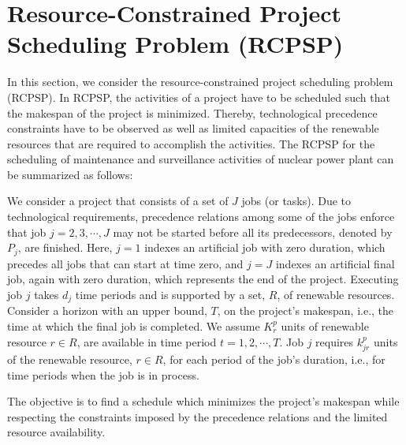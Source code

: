 \section{Resource-Constrained Project Scheduling Problem (RCPSP)}
\label{sec:RCPSP}

In this section, we consider the resource-constrained project scheduling problem (RCPSP).
In RCPSP, the activities of a project have to be scheduled such that the makespan of the
project is minimized. Thereby, technological precedence constraints have to be observed
as well as limited capacities of the renewable resources that are required to accomplish
the activities. The RCPSP for the scheduling of maintenance and surveillance activities
of nuclear power plant can be summarized as follows:

We consider a project that consists of a set of $J$ jobs (or tasks). Due to technological
requirements, precedence relations among some of the jobs enforce that job $j=2,3,\cdots,J$
may not be started before all its predecessors, denoted by $P_j$, are finished. Here,
$j=1$ indexes an artificial job with zero duration, which precedes all jobs that can
start at time zero, and  $j=J$ indexes an artificial final job, again with zero duration,
which represents the end of the project. Executing job $j$ takes $d_j$ time periods and
is supported by a set, $R$, of renewable resources. Consider a horizon with an upper
bound, $T$, on the project's makespan, i.e., the time at which the final job
is completed. We assume $K_{r}^{p}$ units of renewable resource $r\in R$, are available
in time period $t=1,2,\cdots,T$. Job $j$ requires $k_{jr}^{p}$  units of the renewable
resource, $r\in R$, for each period of the job’s duration, i.e., for time periods
when the job is in process.

The objective is to find a schedule which minimizes the project’s makespan while
respecting the constraints imposed by the precedence relations and the limited
resource availability.

